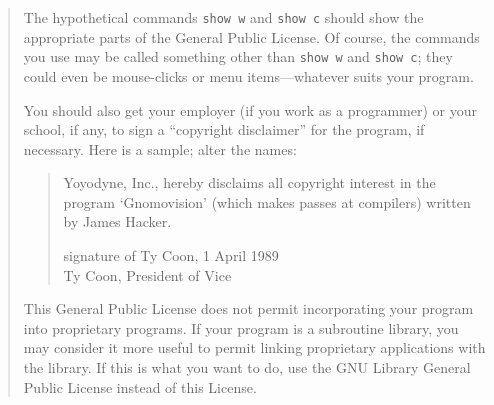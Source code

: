 \documentclass[twoside,11pt]{article}
\renewcommand{\_}{\texttt{\symbol{95}}}
\newcommand{\latexonlysmall}{\small}
\newcommand{\latexonlysmall}{}
\begin{document}
\begin{quote}
The hypothetical commands {\tt show w} and {\tt show c} should show the
appropriate parts of the General Public License.  Of course, the commands
you use may be called something other than {\tt show w} and {\tt show c};
they could even be mouse-clicks or menu items---whatever suits your
program.

You should also get your employer (if you work as a programmer) or your
school, if any, to sign a ``copyright disclaimer'' for the program, if
necessary.  Here is a sample; alter the names:

\begin{quote}
Yoyodyne, Inc., hereby disclaims all copyright interest in the program
`Gnomovision' (which makes passes at compilers) written by James Hacker.

signature of Ty Coon, 1 April 1989 \\
Ty Coon, President of Vice
\end{quote}


This General Public License does not permit incorporating your program
into proprietary programs.  If your program is a subroutine library, you
may consider it more useful to permit linking proprietary applications
with the library.  If this is what you want to do, use the GNU Library
General Public License instead of this License.
\end{quote}
% 
%
% 
% 
\end{document}
